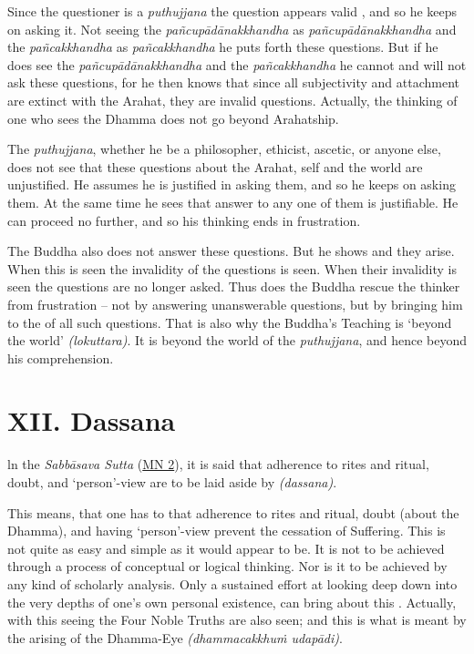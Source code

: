 Since the questioner is a \emph{puthujjana} the question appears valid , and so he keeps on asking it. Not seeing the \emph{pañcupādānakkhandha} as \emph{pañcupādānakkhandha} and the \emph{pañcakkhandha} as \emph{pañcakkhandha} he puts forth these questions. But if he does see the \emph{pañcupādānakkhandha} and the \emph{pañcakkhandha} he cannot and will not ask these questions, for he then knows that since all subjectivity and attachment are extinct with the Arahat, they are invalid questions. Actually, the thinking of one who sees the Dhamma does not go beyond Arahatship.

The \emph{puthujjana}, whether he be a philosopher, ethicist, ascetic, or anyone else, does not see that these questions about the Arahat, self and the world are unjustified. He assumes he is justified in asking them, and so he keeps on asking them. At the same time he sees that  answer to any one of them is justifiable. He can proceed no further, and so his thinking ends in frustration.

The Buddha also does not answer these questions. But he shows  and  they arise. When this is seen the invalidity of the questions is seen. When their invalidity is seen the questions are no longer asked. Thus does the Buddha rescue the thinker from frustration -- not by answering unanswerable questions, but by bringing him to the  of all such questions. That is also why the Buddha's Teaching is `beyond the world' \emph{(lokuttara)}. It is beyond the world of the \emph{puthujjana}, and hence beyond his comprehension.

\section{XII. Dassana}

ln the \emph{Sabbāsava Sutta} (\href{https://suttacentral.net/mn2/en/bodhi}{MN 2}), it is said that adherence to rites and ritual, doubt, and `person'-view are to be laid aside by  \emph{(dassana)}.

This means, that one has to  that adherence to rites and ritual, doubt (about the Dhamma), and having `person'-view prevent the cessation of Suffering. This  is not quite as easy and simple as it would appear to be. It is not to be achieved through a process of conceptual or logical thinking. Nor is it to be achieved by any kind of scholarly analysis. Only a sustained effort at looking deep down into the very depths of one's own personal existence, can bring about this . Actually, with this seeing the Four Noble Truths are also seen; and this is what is meant by the arising of the Dhamma-Eye \emph{(dhammacakkhuṁ udapādi)}.

